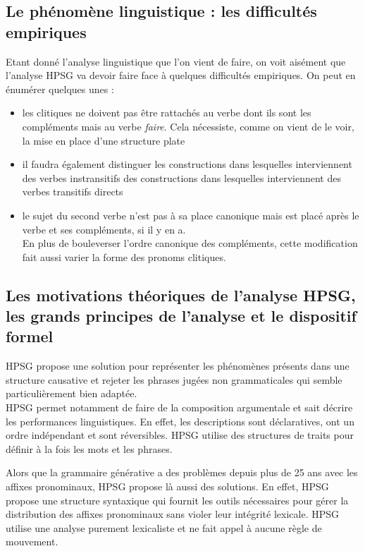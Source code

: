 \subsection{Le phénomène linguistique : les difficultés empiriques}

Etant donné l'analyse linguistique que l'on vient de faire, on voit aisément que l'analyse HPSG va devoir faire face à quelques difficultés empiriques.
On peut en énumérer quelques unes :\\

\begin{itemize}
  \item les clitiques ne doivent pas être rattachés au verbe dont ils sont les compléments mais au verbe \emph{faire}.
    Cela nécessiste, comme on vient de le voir, la mise en place d'une structure plate
  \item il faudra également distinguer les constructions dans lesquelles interviennent des verbes instransitifs des constructions dans lesquelles interviennent des verbes transitifs directs
  \item le sujet du second verbe n'est pas à sa place canonique mais est placé après le verbe et ses compléments, si il y en a.\\
    En plus de bouleverser l'ordre canonique des compléments, cette modification fait aussi varier la forme des pronoms clitiques.
\end{itemize}


\subsection{Les motivations théoriques de l'analyse HPSG, les grands principes de l'analyse et le dispositif formel}

HPSG propose une solution pour représenter les phénomènes présents dans une structure causative et rejeter les phrases jugées non grammaticales qui semble particulièrement bien adaptée.\\

HPSG permet notamment de faire de la composition argumentale et sait décrire les performances linguistiques.
En effet, les descriptions sont déclaratives, ont un ordre indépendant et sont réversibles.
HPSG utilise des structures de traits pour définir à la fois les mots et les phrases.

Alors que la grammaire générative a des problèmes depuis plus de 25 ans avec les affixes pronominaux, HPSG propose là aussi des solutions.
En effet, HPSG propose une structure syntaxique qui fournit les outils nécessaires pour gérer la distribution des affixes pronominaux sans violer leur intégrité lexicale.
HPSG utilise une analyse purement lexicaliste et ne fait appel à aucune règle de mouvement.\\

